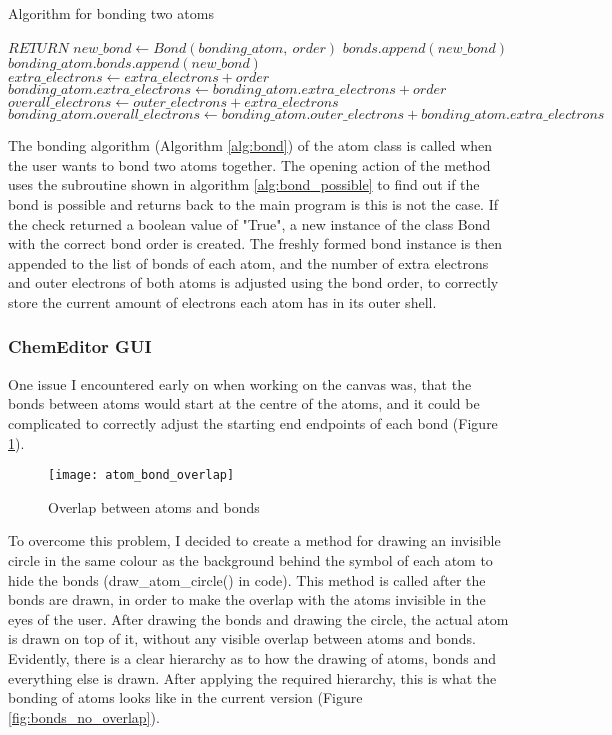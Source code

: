 \documentclass[a4paper,12pt]{article}
\begin{document}
\begin{algorithm}
\footnotesize
\caption{Algorithm for bonding two atoms}\label{alg:bond}
\begin{algorithmic}
	\State $ RETURN$
\EndIf
\State $ new\_bond\gets Bond(bonding\_atom,\ order)$
\State $ bonds.append(new\_bond)$
\State $ bonding\_atom.bonds.append(new\_bond)$
\State $ extra\_electrons\gets extra\_electrons + order$
\State $ bonding\_atom.extra\_electrons\gets bonding\_atom.extra\_electrons + order$
\State $ overall\_electrons\gets outer\_electrons + extra\_electrons$
\State $ bonding\_atom.overall\_electrons\gets bonding\_atom.outer\_electrons + bonding\_atom.extra\_electrons$
\EndFunction
\end{algorithmic}
\end{algorithm}

The bonding algorithm (Algorithm \ref{alg:bond}) of the atom class is called when the user wants to bond two atoms together. The opening action of the method uses the subroutine shown in algorithm \ref{alg:bond_possible} to find out if the bond is possible and returns back to the main program is this is not the case. If the check returned a boolean value of "True", a new instance of the class Bond with the correct bond order is created. The freshly formed bond instance is then appended to the list of bonds of each atom, and the number of extra electrons and outer electrons of both atoms is adjusted using the bond order, to correctly store the current amount of electrons each atom has in its outer shell.

\newpage

\subsubsection{ChemEditor GUI}

One issue I encountered early on when working on the canvas was, that the bonds between atoms would start at the centre of the atoms, and it could be complicated to correctly adjust the starting end endpoints of each bond (Figure \ref{fig:atom_bond_overlap}).

\begin{figure} [h]
	\centering
	\texttt{[image: atom\_bond\_overlap]}
	\caption{Overlap between atoms and bonds}
	\label{fig:atom_bond_overlap}
\end{figure}

To overcome this problem, I decided to create a method for drawing an invisible circle in the same colour as the background behind the symbol of each atom to hide the bonds (draw\_atom\_circle() in code). This method is called after the bonds are drawn, in order to make the overlap with the atoms invisible in the eyes of the user. After drawing the bonds and drawing the circle, the actual atom is drawn on top of it, without any visible overlap between atoms and bonds. Evidently, there is a clear hierarchy as to how the drawing of atoms, bonds and everything else is drawn. After applying the required hierarchy, this is what the bonding of atoms looks like in the current version (Figure \ref{fig:bonds_no_overlap}).
\end{document}

